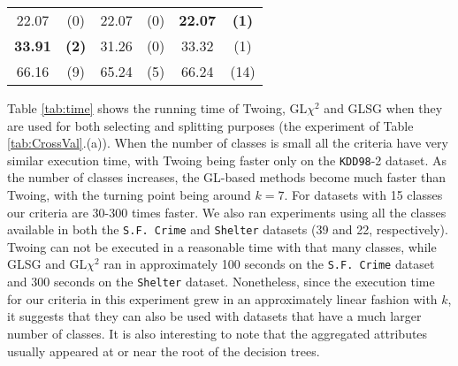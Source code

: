 \begin{table*}
\begin{subtable}{.4\linewidth}
\begin{tabular}{cc|cc|cc}
 22.07      &  (0)             &  22.07       & (0)             & {\bf 22.07} &  {\bf (1)}          \\
 {\bf 33.91}&  {\bf (2)}       & 31.26        &  (0)            &  33.32      &  (1)                 \\  \hline
 66.16      &  (9)             & 65.24        & (5)             &  66.24      & (14)
       \end{tabular}
    \end{subtable} 
\end{table*}


Table \ref{tab:time} shows the running time of Twoing, GL$\chi^2$ and GLSG  when
they are used for both selecting and splitting purposes (the experiment of Table \ref{tab:CrossVal}.(a)).
When the number of classes is small all the criteria have very similar execution time, with Twoing being faster only on the {\tt KDD98}-2 dataset. As the number of classes increases, the GL-based methods become much faster than Twoing, with the turning point being around $k=7$. For datasets with 15 classes our criteria are 30-300 times faster. We also ran experiments using all the classes available in both the {\tt S.F. Crime} and {\tt Shelter} datasets (39 and 22, respectively). Twoing can not be executed in a reasonable time with that many classes, while GLSG and GL$\chi^2$ ran in approximately 100 seconds on the {\tt S.F. Crime} dataset and  300 seconds on the {\tt Shelter} dataset. Nonetheless, since the execution time for our criteria in this experiment grew in an approximately linear fashion with $k$, it suggests that they can also be used with datasets that have a much larger number of classes. It is also interesting to note that the aggregated attributes usually appeared at or near the root of the decision trees.


